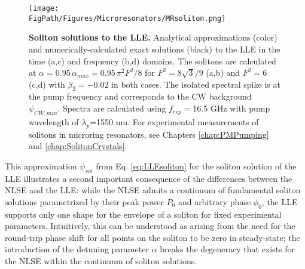 \begin{figure}[htpb]
	\begin{center}
		\texttt{[image: \\FigPath/Figures/Microresonators/MRsoliton.png]}
	\end{center}
	\caption[Soliton solutions to the LLE]{\textbf{Soliton solutions to the LLE.} Analytical approximations (color) and numerically-calculated exact solutions (black) to the LLE in the time (a,c) and frequency (b,d) domains. The solitons are calculated at $\alpha=0.95\,\alpha_{max}=0.95\,\pi^2F^2/8$ for $F^2=8\sqrt{3}/9$ (a,b) and $F^2=6$ (c,d) with $\beta_2=-0.02$ in both cases. The isolated spectral spike is at the pump frequency and corresponds to the CW background $\psi_{CW,min}$. Spectra are calculated using $f_{rep}=$16.5 GHz with pump wavelength of $\lambda_p$=1550 nm. For experimental measurements of solitons in microring resonators, see Chapters \ref{chap:PMPumping} and \ref{chap:SolitonCrystals}.
	}
	
	\label{fig:MRsoliton}
\end{figure} 


This approximation $\psi_{sol}$ from Eq. \ref{eq:LLEsoliton} for the soliton solution of the LLE illustrates a second important consequence of the differences between the NLSE and the LLE: while the NLSE admits a continuum of fundamental soliton solutions parametrized by their peak power $P_0$ and arbitrary phase $\phi_0$, the LLE supports only one shape for the envelope of a soliton for fixed experimental parameters.  Intuitively, this can be understood as arising from the need for the round-trip phase shift for all points on the soliton to be zero in steady-state; the introduction of the detuning parameter $\alpha$ breaks the degeneracy that exists for the NLSE within the continuum of soliton solutions.

